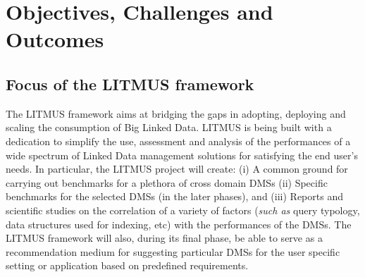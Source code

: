 \documentclass{llncs}
\begin{document}
    
    

\section{Objectives, Challenges and Outcomes}\label{Objectives}
    \subsection{Focus of the LITMUS framework}
        The LITMUS framework aims at bridging the gaps in adopting, deploying and scaling the consumption of Big Linked Data. LITMUS is being built with a dedication to simplify the use, assessment and analysis of the performances of a wide spectrum of Linked Data management solutions for satisfying the end user's needs.  In particular, the LITMUS project will create: (i) A common ground for carrying out benchmarks for a plethora of cross domain DMSs (ii) Specific benchmarks for the selected DMSs (in the later phases), and  (iii) Reports and scientific studies on the correlation of a variety of factors (\textit{such as} query typology, data structures used for indexing, etc) with the performances of the DMSs. The LITMUS framework will also, during its final phase, be able to serve as a recommendation medium for suggesting particular DMSs for the user specific setting or application based on predefined requirements. 
\end{document}

